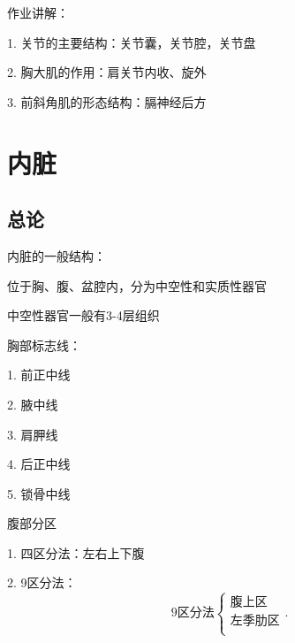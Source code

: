 \begin{notation}
    作业讲解：

    1. 关节的主要结构：关节囊，关节腔，关节盘

    2. 胸大肌的作用：肩关节内收、旋外

    3. 前斜角肌的形态结构：膈神经后方
\end{notation}
\section{内脏}%
\label{sec:内脏}
\subsection{总论}%
\label{sub:总论}
\begin{notation}
    内脏的一般结构：

    位于胸、腹、盆腔内，分为中空性和实质性器官

    中空性器官一般有3-4层组织
\end{notation}
胸部标志线：

1. 前正中线

2. 腋中线

3. 肩胛线

4. 后正中线

5. 锁骨中线

腹部分区

1. 四区分法：左右上下腹

2. 9区分法：
\[
    \text{9区分法}\begin{cases}
        \text{腹上区}\\
        \text{左季肋区}\\
    \end{cases}
.\] 
